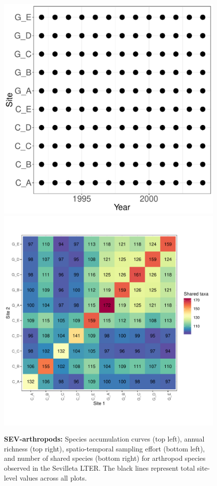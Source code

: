 \documentclass[11pt, oneside]{article}
\begin{document}
\begin{figure}[h!]
\includegraphics[scale = 0.4]{sev-arthropods-compagnoni_spatiotemporal_sampling_effort.pdf}
\includegraphics[scale = 0.4]{sev-arthropods-compagnoni_spp_shared.pdf}
\caption{{\bf SEV-arthropods:} Species accumulation curves (top left),  annual richness (top right), spatio-temporal sampling effort (bottom left), and number of shared species (bottom right) for arthropod species observed in the Sevilleta LTER. The black lines represent total site-level values across all plots.}
\label{sev-arthropods}
\end{figure}
\end{document}
